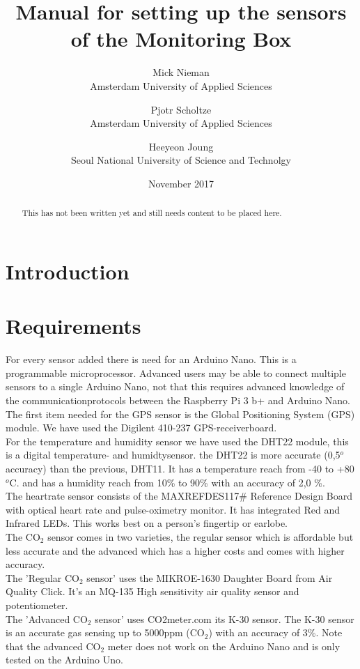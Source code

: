 \documentclass{report}
\title{Manual for setting up the sensors of the Monitoring Box}
\author{Mick Nieman \\ Amsterdam University of Applied Sciences \and Pjotr Scholtze \\ Amsterdam University of Applied Sciences \and Heeyeon Joung \\ Seoul National University of Science and Technolgy}
\date{November 2017}
\begin{document}
\maketitle
\begin{abstract}
This has not been written yet and still needs content to be placed here. 
\end{abstract}

\tableofcontents

\chapter{Introduction}

\chapter{Requirements}
For every sensor added there is need for an Arduino Nano. This is a programmable microprocessor. Advanced users may be able to connect multiple sensors to a single Arduino Nano, not that this requires advanced knowledge of the communicationprotocols between the Raspberry Pi 3 b+ and Arduino Nano. \\

The first item needed for the GPS sensor is the Global Positioning System (GPS) module. We have used the Digilent 410-237 GPS-receiverboard. \\

For the temperature and humidity sensor we have used the DHT22 module, this is a digital temperature- and humidtysensor. the DHT22 is more accurate (0,5$^o$ accuracy) than the previous, DHT11. It has a temperature reach from -40 to +80 $^o$C. and has a humidity reach from 10\% to 90\% with an accuracy of 2,0 \%.  \\

The heartrate sensor consists of the MAXREFDES117\# Reference Design Board with optical heart rate and pulse-oximetry monitor. It has integrated Red and Infrared LEDs. This works best on a person's fingertip or earlobe. \\

The CO$_2$ sensor comes in two varieties, the regular sensor which is affordable but less accurate and the advanced which has a higher costs and comes with higher accuracy. \\
The 'Regular CO$_2$ sensor' uses the MIKROE-1630 Daughter Board from Air Quality Click. It's an MQ-135 High sensitivity air quality sensor and potentiometer. \\
The 'Advanced CO$_2$ sensor' uses CO2meter.com its K-30 sensor. The K-30 sensor is an accurate gas sensing up to 5000ppm (CO$_2$) with an accuracy of 3\%. Note that the advanced CO$_2$ meter does not work on the Arduino Nano and is only tested on the Arduino Uno. \\
\end{document}
